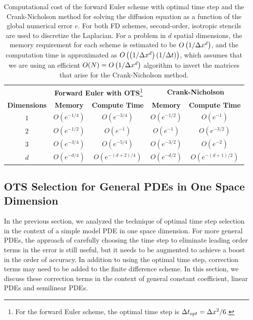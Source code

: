 \documentclass[oneeqnum,onefignum,onetabnum,onethmnum]{siamltex}
\begin{document}
\begin{table}[tbh]
\caption{\label{tab:comp_perf_vs_dim}
   Computational cost of the forward Euler scheme with optimal time step and 
   the Crank-Nicholson method for solving the diffusion equation as a function 
   of the global numerical error $e$.
   For both FD schemes, second-order, isotropic stencils are used to discretize 
   the Laplacian.  For a problem in $d$ spatial dimensions, the memory 
   requirement for each scheme is estimated to be $O \left(1/\Delta x^d \right)$, 
   and the computation time is approximated as 
   $O\left( \left(1/\Delta x^d \right) (1/\Delta t) \right)$, which assumes that we 
   are using an efficient $O(N) = O \left( 1/\Delta x^d \right)$ algorithm to 
   invert the matrices that arise for the Crank-Nicholson method.
}
\begin{minipage}{\textwidth}
\begin{center} \footnotesize
\renewcommand{\arraystretch}{1.5}
\begin{tabular}{|c|c|c|c|c|}
  \hline
  & \multicolumn{2}{|c|}{{\bf Forward Euler with OTS}\footnote{For the forward 
    Euler scheme, the optimal time step is $\Delta t_{opt} = \Delta x^2/6$.}}
  & \multicolumn{2}{|c|}{\bf Crank-Nicholson} \\
  \cline{2-3} \cline{4-5} 
    {\bf Dimensions} & {\bf Memory} & {\bf Compute Time} 
  & {\bf Memory} & {\bf Compute Time} \\
  \hline 
  $1$ & $O\left( e^{-1/4} \right)$ 
      & $O\left( e^{-3/4} \right)$ 
      & $O\left( e^{-1/2} \right)$ 
      & $O\left( e^{-1} \right)$ \\ 
  $2$ & $O\left( e^{-1/2} \right)$ 
      & $O\left( e^{-1} \right)$ 
      & $O\left( e^{-1} \right)$ 
      & $O\left( e^{-3/2} \right)$ \\ 
  $3$ & $O\left( e^{-3/4} \right)$ 
      & $O\left( e^{-5/4} \right)$ 
      & $O\left( e^{-3/2} \right)$ 
      & $O\left( e^{-2} \right)$ \\
  $d$ & $O\left( e^{-d/4} \right)$ 
      & $O\left( e^{-(d+2)/4} \right)$ 
      & $O\left( e^{-d/2} \right)$ 
      & $O\left( e^{-(d+1)/2} \right)$ \\ 
  \hline 
\end{tabular}
\end{center}
\end{minipage}
\end{table}


\subsection{\label{sec:ots_general_1d_pdes} 
            OTS Selection for General PDEs in One Space Dimension} 
In the previous section, we analyzed the technique of optimal time step 
selection in the context of a simple model PDE in one space dimension.  
For more general PDEs, the approach of carefully choosing the time step to 
eliminate leading order terms in the error is still useful, but it needs to 
be augmented to achieve a boost in the order of accuracy.  In addition to 
using the optimal time step, correction terms may need to be added to the 
finite difference scheme.  In this section, we discuss these correction terms 
in the context of general constant coefficient, linear PDEs and semilinear
PDEs. 
\end{document}
